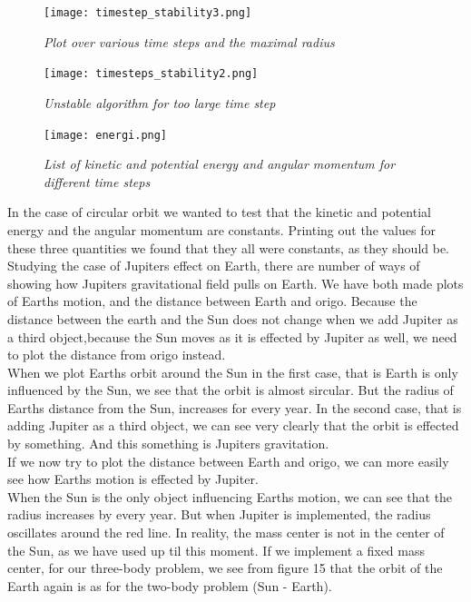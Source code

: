 \documentclass[a4paper,12pt, english]{article}
\begin{document}
\begin{figure}[h!]
  \centering
   	 \texttt{[image: timestep\_stability3.png]}
  \caption{\textit{Plot over various time steps and the maximal radius}}
\end{figure}

\begin{figure}[h!]
  \centering
   	 \texttt{[image: timesteps\_stability2.png]}
  \caption{\textit{Unstable algorithm for too large time step}}
\end{figure}



\begin{figure}[h!]
  \centering
   	 \texttt{[image: energi.png]}
  \caption{\textit{List of kinetic and potential energy and angular momentum for different time steps}}
\end{figure}

In the case of circular orbit we wanted to test that the kinetic and potential energy and the angular momentum are constants. Printing out the values for these three quantities we found that they all were constants, as they should be.\\

Studying the case of Jupiters effect on Earth, there are number of ways of showing how Jupiters gravitational field pulls on Earth. We have both made plots of Earths motion, and the distance between Earth and origo. Because the distance between the earth and the Sun does not change when we add Jupiter as a third object,because the Sun moves as it is effected by Jupiter as well, we need to plot the distance from origo instead. \\

When we plot Earths orbit around the Sun in the first case, that is Earth is only influenced by the Sun, we see that the orbit is almost sircular. But the radius of Earths distance from the Sun, increases for every year. In the second case, that is adding Jupiter as a third object, we can see very clearly that the orbit is effected by something. And this something is Jupiters gravitation. \\

If we now try to plot the distance between Earth and origo, we can more easily see how Earths motion is effected by Jupiter. \\

When the Sun is the only object influencing Earths motion, we can see that the radius increases by every year. But when Jupiter is implemented, the radius oscillates around the red line. In reality, the mass center is not in the center of the Sun, as we have used up til this moment. If we implement a fixed mass center, for our three-body problem, we see from figure 15 that the orbit of the Earth again is as for the two-body problem (Sun - Earth). \\
\end{document}
